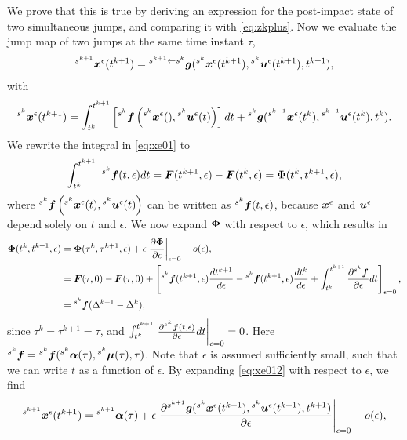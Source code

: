 \documentclass[../DC2019003Bouma.tex]{subfiles}
\begin{document}
We prove that this is true by deriving an expression for the post-impact state of two simultaneous jumps, and comparing it with \eqref{eq:zkplus}. Now we evaluate the jump map of two jumps at the same time instant $\tau$,
\begin{align}
\hspace{0cm}^{s^{k+1}}{\boldsymbol{x}}^\epsilon(t^{k+1}) = \hspace{0cm}^{s^{k+1}\leftarrow s^k}{\boldsymbol{g}}(\hspace{0cm}^{s^k}{\boldsymbol{x}}^{\epsilon}(t^{k+1}),\hspace{0cm}^{s^k}{\boldsymbol{u}}^\epsilon(t^{k+1}),t^{k+1}),\label{eq:xe012}
\end{align}
with
\begin{align}
\hspace{0cm}^{s^k}{\boldsymbol{x}}^{\epsilon}(t^{k+1}) = \int_{t^{k}}^{t^{k+1}}\left[\hspace{0cm}^{s^{k}}{\boldsymbol{f}}\left(\hspace{0cm}^{s^{k}}{\boldsymbol{x}}^\epsilon(),\hspace{0cm}^{s^{k}}{\boldsymbol{u}}^\epsilon(t)\right)\right]dt + \hspace{0cm}^{s^{k}}{\boldsymbol{g}}(\hspace{0cm}^{s^{k-1}}{\boldsymbol{x}}^\epsilon(t^{k}),\hspace{0cm}^{s^{k-1}}{\boldsymbol{u}}^\epsilon(t^{k}),t^{k}).\label{eq:xe01}
\end{align}
We rewrite the integral in \eqref{eq:xe01} to
\begin{align}
\int_{t^{k}}^{t^{k+1}}\ \hspace{0cm}^{s^{k}}{\boldsymbol{f}}(t,\epsilon)dt = {\boldsymbol{F}}(t^{k+1},\epsilon) - {\boldsymbol{F}}(t^{k},\epsilon) = \boldsymbol{\Phi}(t^{k},t^{k+1},\epsilon),
\end{align}
where $^{s^{k}}{\boldsymbol{f}}\left(\hspace{0cm}^{s^{k}}{\boldsymbol{x}}^\epsilon(t),\hspace{0cm}^{s^{k}}{\boldsymbol{u}}^\epsilon(t)\right)$ can be written as $\hspace{0cm}^{s^{k}}{\boldsymbol{f}}(t,\epsilon)$, because ${\boldsymbol{x}}^\epsilon$ and ${\boldsymbol{u}}^\epsilon$ depend solely on $t$ and $\epsilon$. We now expand $\boldsymbol{\Phi}$ with respect to $\epsilon$, which results in
\begin{align}
\boldsymbol{\Phi}(t^{k},t^{k+1},\epsilon) &= \boldsymbol{\Phi}(\tau^{k},\tau^{k+1},\epsilon) + \epsilon\left.\frac{\partial\boldsymbol{\Phi}}{\partial\epsilon}\right|_{\epsilon = 0} + o(\epsilon),\\
&= {\boldsymbol{F}}(\tau,0) - {\boldsymbol{F}}(\tau,0) + \left[\hspace{0cm}^{s^{k}}{\boldsymbol{f}}(t^{k+1},\epsilon)\frac{dt^{k+1}}{d\epsilon} - \hspace{0cm}^{s^{k}}{\boldsymbol{f}}(t^{k+1},\epsilon)\frac{dt^{k}}{d\epsilon} + \int_{t^{k}}^{t^{k+1}}\frac{\partial\hspace{0cm}^{s^{k}}{\boldsymbol{f}}}{\partial\epsilon}dt\right]_{\epsilon=0},\\
&= \hspace{0cm}^{s^{k}}{\boldsymbol{f}}(\Delta^{k+1}-\Delta^{k}), 
\end{align}
since $\tau^k = \tau^{k+1} = \tau$, and $\int_{t^{k}}^{t^{k+1}}\left.\frac{\partial\hspace{0cm}^{s^{k}}{\boldsymbol{f}}(t,\epsilon)}{\partial\epsilon}dt\right|_{\epsilon = 0} = 0$. Here $\hspace{0cm}^{s^{k}}{\boldsymbol{f}} = \hspace{0cm}^{s^{k}}{\boldsymbol{f}}(\hspace{0cm}^{s^{k}}\boldsymbol{\alpha}(\tau),\hspace{0cm}^{s^{k}}\boldsymbol{\mu}(\tau),\tau)$. Note that $\epsilon$ is assumed sufficiently small, such that we can write $t$ as a function of $\epsilon$. By expanding \eqref{eq:xe012} with respect to $\epsilon$, we find
\begin{align}
\hspace{0cm}^{s^{k+1}}{\boldsymbol{x}}^\epsilon(t^{k+1}) = \hspace{0cm}^{s^{k+1}}\boldsymbol{\alpha}(\tau) + \epsilon\left.\frac{\partial\hspace{0cm}^{s^{k+1}}{\boldsymbol{g}}(\hspace{0cm}^{s^{k}}{\boldsymbol{x}}^\epsilon(t^{k+1}),\hspace{0cm}^{s^{k}}{\boldsymbol{u}}^\epsilon(t^{k+1}),t^{k+1})}{\partial\epsilon}\right|_{\epsilon=0} + o(\epsilon),\label{eq:xe012exp}
\end{align}
\end{document}

